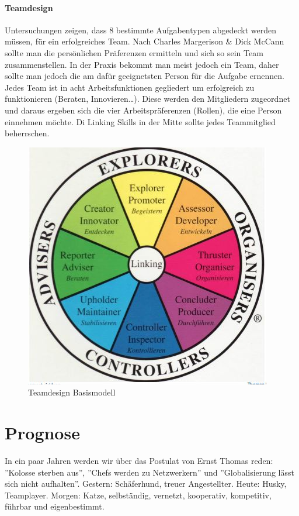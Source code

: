 \paragraph{Teamdesign} 
Untersuchungen zeigen, dass 8 bestimmte Aufgabentypen abgedeckt werden müssen, für ein erfolgreiches Team. Nach Charles Margerison \& Dick McCann sollte man die persönlichen Präferenzen ermitteln und sich so sein Team zusammenstellen. In der Praxis bekommt man meist jedoch ein Team, daher sollte man jedoch die am dafür geeignetsten Person für die Aufgabe ernennen. Jedes Team ist in acht Arbeitsfunktionen gegliedert um erfolgreich zu funktionieren (Beraten, Innovieren\dots). Diese werden den Mitgliedern zugeordnet und daraus ergeben sich die vier Arbeitspräferenzen (Rollen), die eine Person einnehmen möchte. Di Linking Skills in der Mitte sollte jedes Teammitglied beherrschen.

\begin{figure}[h!]
\centering
\includegraphics[width=0.5\linewidth]{fig/teamentwicklung-teamdesign-basismodell}
\caption{Teamdesign Basismodell}
\label{fig:teamentwicklung-teamdesign-basismodell}
\end{figure}

\section{Prognose}
In ein paar Jahren werden wir über das Postulat von Ernst Thomas reden: ''Kolosse sterben aus'', ''Chefs werden zu Netzwerkern'' und ''Globalisierung lässt sich nicht aufhalten''. Gestern: Schäferhund, treuer Angestellter. Heute: Husky, Teamplayer. Morgen: Katze, selbständig, vernetzt, kooperativ, kompetitiv, führbar und eigenbestimmt.